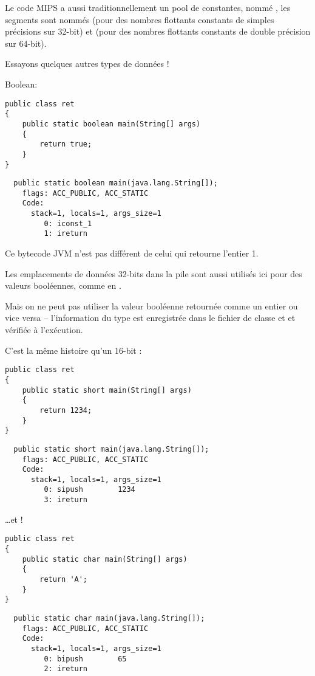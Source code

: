 Le code MIPS a aussi traditionnellement un pool de constantes, nommé , les segments
sont nommés  (pour des nombres flottants constants de simples précisions sur 32-bit) et 
(pour des nombres flottants constants de double précision sur 64-bit).

Essayons quelques autres types de données !

Boolean:

\begin{lstlisting}[style=customjava]
public class ret
{
	public static boolean main(String[] args) 
	{
		return true;
	}
}
\end{lstlisting}

\begin{lstlisting}
  public static boolean main(java.lang.String[]);
    flags: ACC_PUBLIC, ACC_STATIC
    Code:
      stack=1, locals=1, args_size=1
         0: iconst_1      
         1: ireturn       
\end{lstlisting}

Ce bytecode JVM n'est pas différent de celui qui retourne l'entier 1.

Les emplacements de données 32-bits dans la pile sont aussi utilisés ici pour des valeurs booléennes, comme en \CCpp.

Mais on ne peut pas utiliser la valeur booléenne retournée comme un entier ou vice versa -- l'information du type est enregistrée dans le fichier de classe et et vérifiée à l'exécution.

C'est la même histoire qu'un  16-bit :

\begin{lstlisting}[style=customjava]
public class ret
{
	public static short main(String[] args) 
	{
		return 1234;
	}
}
\end{lstlisting}

\begin{lstlisting}
  public static short main(java.lang.String[]);
    flags: ACC_PUBLIC, ACC_STATIC
    Code:
      stack=1, locals=1, args_size=1
         0: sipush        1234
         3: ireturn       
\end{lstlisting}

\dots et !

\begin{lstlisting}[style=customjava]
public class ret
{
	public static char main(String[] args) 
	{
		return 'A';
	}
}
\end{lstlisting}

\begin{lstlisting}
  public static char main(java.lang.String[]);
    flags: ACC_PUBLIC, ACC_STATIC
    Code:
      stack=1, locals=1, args_size=1
         0: bipush        65
         2: ireturn       
\end{lstlisting}

